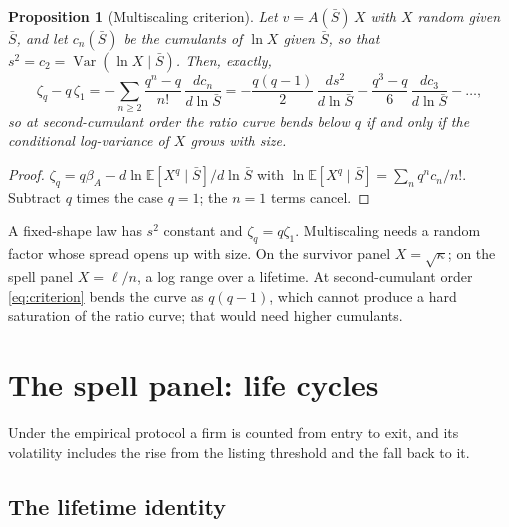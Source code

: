 \documentclass[11pt]{article}
\newcommand{\E}{\mathbb E}
\newcommand{\Var}{\operatorname{Var}}
\newtheorem{proposition}{Proposition}
\begin{document}
\begin{proposition}[Multiscaling criterion]\label{prop:criterion}
Let $v=A(\bar S)\,X$ with $X$ random given $\bar S$, and let $c_n(\bar S)$ be the cumulants of $\ln X$
given $\bar S$, so that $s^2=c_2=\Var(\ln X\mid\bar S)$.  Then, exactly,
\begin{equation}
  \zeta_q-q\,\zeta_1=-\sum_{n\ge2}\frac{q^n-q}{n!}\,\frac{dc_n}{d\ln\bar S}
  =-\frac{q(q-1)}{2}\,\frac{ds^2}{d\ln\bar S}-\frac{q^3-q}{6}\,\frac{dc_3}{d\ln\bar S}-\dots,
  \label{eq:criterion}
\end{equation}
so at second-cumulant order the ratio curve bends below $q$ if and only if the conditional
log-variance of $X$ grows with size.
\end{proposition}
\begin{proof}
$\zeta_q=q\beta_A-d\ln\E[X^q\mid\bar S]/d\ln\bar S$ with $\ln\E[X^q\mid\bar S]=\sum_nq^nc_n/n!$.
Subtract $q$ times the case $q=1$; the $n=1$ terms cancel.
\end{proof}
A fixed-shape law has $s^2$ constant and $\zeta_q=q\zeta_1$.  Multiscaling needs a random factor
whose spread opens up with size.  On the survivor panel $X=\sqrt\kappa$; on the spell panel
$X=\ell/n$, a log range over a lifetime.  At second-cumulant order \eqref{eq:criterion} bends the curve as $q(q-1)$, which cannot produce a
hard saturation of the ratio curve; that would need higher cumulants.

\section{The spell panel: life cycles}
\label{sec:spells}

Under the empirical protocol a firm is counted from entry to exit, and its volatility includes
the rise from the listing threshold and the fall back to it.

\subsection{The lifetime identity}
\label{sec:identity}
\end{document}
